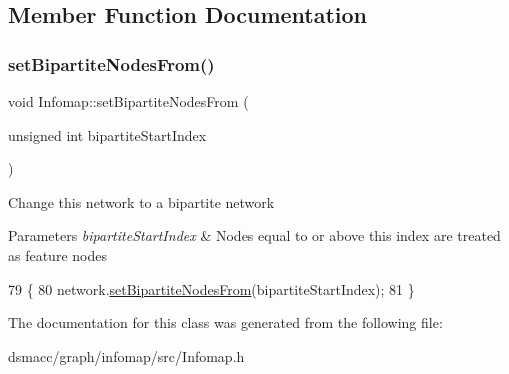 \subsection{Member Function Documentation}
\mbox{\label{classInfomap_ade43d1ba11abfdc5346870ae2b7fc851}} 
\subsubsection{\texorpdfstring{set\+Bipartite\+Nodes\+From()}{setBipartiteNodesFrom()}}
{\footnotesize\ttfamily void Infomap\+::set\+Bipartite\+Nodes\+From (\begin{DoxyParamCaption}\item[{unsigned int}]{bipartite\+Start\+Index }\end{DoxyParamCaption})\hspace{0.3cm}{\ttfamily [inline]}}

Change this network to a bipartite network 
\begin{DoxyParams}{Parameters}
{\em bipartite\+Start\+Index} & Nodes equal to or above this index are treated as feature nodes \\
\hline
\end{DoxyParams}

\begin{DoxyCode}
79                                                                  \{
80         network.\mbox{\hyperlink{classNetwork_a7ebe3a5e948fc60e81fb94df08ca4358}{setBipartiteNodesFrom}}(bipartiteStartIndex);
81     \}
\end{DoxyCode}


The documentation for this class was generated from the following file\+:\begin{DoxyCompactItemize}
\item 
dsmacc/graph/infomap/src/Infomap.\+h\end{DoxyCompactItemize}
